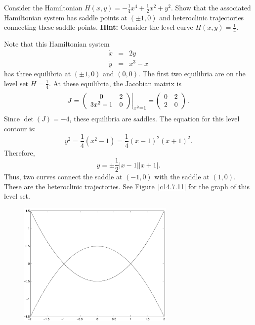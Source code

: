 \documentclass{ximera}
\begin{document}
\begin{exercise} \label{c14.7.11} 
Consider the Hamiltonian  $H(x,y) = -\frac{1}{4}x^4 + \frac{1}{2}x^2 + y^2$.  
Show that the associated Hamiltonian system has saddle points at $(\pm 1,0)$ 
and heteroclinic trajectories connecting these saddle points.  {\bf Hint:} 
Consider the level curve $H(x,y) = \frac{1}{4}$.

\begin{solution}

Note that this Hamiltonian system
\begin{eqnarray*}
\dot{x}& = & 2y\\
\dot{y} &  =&  x^3 -x
\end{eqnarray*}
has three equilibria at $(\pm 1,0)$ and $(0,0)$.  The first two equilibria
are on the level set $H= \frac{1}{4}$.  At these equilibria, the Jacobian
matrix is
\[
J = \left.\left(\begin{array}{cc} 0 & 2\\ 3x^2-1 &0\end{array}\right)\right|_{x^2=1} = 
\left(\begin{array}{cc} 0 & 2\\ 2 &0\end{array}\right).
\]
Since $\det(J)=-4$, these equilibria are saddles.
The equation for this level contour is: 
\[
y^2=\frac{1}{4}(x^2-1)=\frac{1}{4}(x-1)^2(x+1)^2.
\]
Therefore,
\[
y = \pm\frac{1}{2}|x-1||x+1|.
\]
Thus, two curves connect the saddle at $(-1,0)$ with the saddle at $(1,0)$.
These are the heteroclinic trajectories. See
Figure~\ref{c14.7.11} for the graph of this level set.

\begin{figure}[htb]
     \centerline{%
      \includegraphics[width=3.0in]{exfigure/fig14-7-11.pdf}}
\end{figure} 
 

\end{solution}
\end{exercise}
\end{document}
